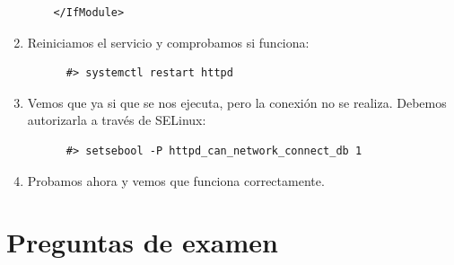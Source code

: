 \documentclass[12pt,spanish]{article}
\begin{document}
\begin{enumerate}
\begin{lstlisting}
    </IfModule>
    \end{lstlisting}
    \item Reiniciamos el servicio y comprobamos si funciona:
    \begin{lstlisting}
      #> systemctl restart httpd
    \end{lstlisting}
    \item Vemos que ya si que se nos ejecuta, pero la conexión no se realiza. Debemos autorizarla a través de SELinux:
    \begin{lstlisting}
      #> setsebool -P httpd_can_network_connect_db 1
    \end{lstlisting}
    \item Probamos ahora y vemos que funciona correctamente.


\end{enumerate}




\newpage
\section{Preguntas de examen}
\end{document}
